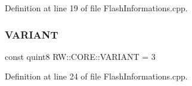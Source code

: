 Definition at line 19 of file Flash\+Informations.\+cpp.

\hypertarget{namespace_r_w_1_1_c_o_r_e_ab54780bf174013fa9c8a2b1bdcdfbaef}{}\label{namespace_r_w_1_1_c_o_r_e_ab54780bf174013fa9c8a2b1bdcdfbaef} 
\subsubsection{\texorpdfstring{V\+A\+R\+I\+A\+NT}{VARIANT}}
{\footnotesize\ttfamily const quint8 R\+W\+::\+C\+O\+R\+E\+::\+V\+A\+R\+I\+A\+NT = 3}



Definition at line 24 of file Flash\+Informations.\+cpp.

